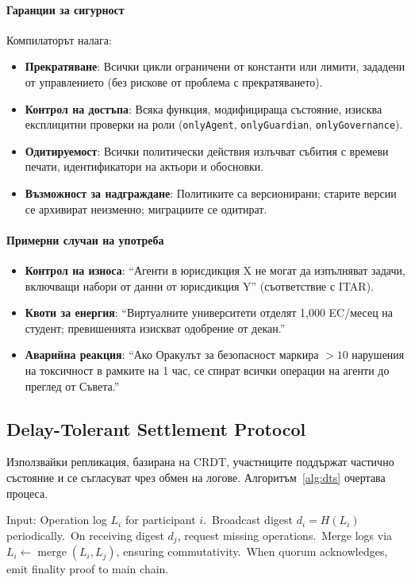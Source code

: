 \documentclass[11pt]{article}
\begin{document}
\paragraph{Гаранции за сигурност} Компилаторът налага:
\begin{itemize}[noitemsep]
  \item \textbf{Прекратяване}: Всички цикли ограничени от константи или лимити, зададени от управлението (без рискове от проблема с прекратяването).
  \item \textbf{Контрол на достъпа}: Всяка функция, модифицираща състояние, изисква експлицитни проверки на роли (\texttt{onlyAgent}, \texttt{onlyGuardian}, \texttt{onlyGovernance}).
  \item \textbf{Одитируемост}: Всички политически действия излъчват събития с времеви печати, идентификатори на актьори и обосновки.
  \item \textbf{Възможност за надграждане}: Политиките са версионирани; старите версии се архивират неизменно; миграциите се одитират.
\end{itemize}

\paragraph{Примерни случаи на употреба}
\begin{itemize}[noitemsep]
  \item \textbf{Контрол на износа}: ``Агенти в юрисдикция X не могат да изпълняват задачи, включващи набори от данни от юрисдикция Y'' (съответствие с ITAR).
  \item \textbf{Квоти за енергия}: ``Виртуалните университети отделят 1,000 EC/месец на студент; превишенията изискват одобрение от декан.''
  \item \textbf{Аварийна реакция}: ``Ако Оракулът за безопасност маркира $>10$ нарушения на токсичност в рамките на 1 час, се спират всички операции на агенти до преглед от Съвета.''
\end{itemize}

\subsection{Delay-Tolerant Settlement Protocol}
Използвайки репликация, базирана на CRDT, участниците поддържат частично състояние и се съгласуват чрез обмен на логове. Алгоритъм~\ref{alg:dts} очертава процеса.

\begin{algorithm}[H]
  \caption{Delay-Tolerant Settlement (DTS)}
  \label{alg:dts}
  \begin{algorithmic}[1]
    \STATE Input: Operation log $L_i$ for participant $i$.\
    \STATE Broadcast digest $d_i = H(L_i)$ periodically.\
    \STATE On receiving digest $d_j$, request missing operations.\
    \STATE Merge logs via $L_i \leftarrow \operatorname{merge}(L_i, L_j)$, ensuring commutativity.\
    \STATE When quorum acknowledges, emit finality proof to main chain.\
  \end{algorithmic}
\end{algorithm}
\end{document}
